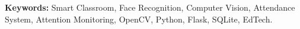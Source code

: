 \documentclass[10pt]{report}
\begin{document}
\vspace{0.5cm}
\noindent \textbf{Keywords:} Smart Classroom, Face Recognition, Computer Vision, Attendance System, Attention Monitoring, OpenCV, Python, Flask, SQLite, EdTech.

\newpage
\renewcommand*\listfigurename{LIST OF FIGURES}
\listoffigures

\newpage
\renewcommand{\listtablename}{LIST OF TABLES}
\listoftables

\newpage
{}
\end{document}
